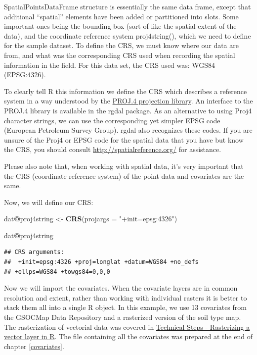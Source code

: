 \documentclass[10pt,b5paper,]{book}
\newenvironment{Shaded}{\begin{snugshade}}{\end{snugshade}}
\newcommand{\DataTypeTok}[1]{\textcolor[rgb]{0.13,0.29,0.53}{#1}}
\newcommand{\KeywordTok}[1]{\textcolor[rgb]{0.13,0.29,0.53}{\textbf{#1}}}
\newcommand{\NormalTok}[1]{#1}
\newcommand{\OperatorTok}[1]{\textcolor[rgb]{0.81,0.36,0.00}{\textbf{#1}}}
\newcommand{\StringTok}[1]{\textcolor[rgb]{0.31,0.60,0.02}{#1}}
\theoremstyle{definition}
\theoremstyle{definition}
\theoremstyle{definition}
\theoremstyle{remark}
\begin{document}
SpatialPointsDataFrame structure is essentially the same data frame,
except that additional ``spatial'' elements have been added or
partitioned into slots. Some important ones being the bounding box (sort
of like the spatial extent of the data), and the coordinate reference
system proj4string(), which we need to define for the sample dataset. To
define the CRS, we must know where our data are from, and what was the
corresponding CRS used when recording the spatial information in the
field. For this data set, the CRS used was: WGS84 (EPSG:4326).

To clearly tell R this information we define the CRS which describes a
reference system in a way understood by the
\href{http://trac.osgeo.org/proj/}{PROJ.4 projection library}. An
interface to the PROJ.4 library is available in the rgdal package. As an
alternative to using Proj4 character strings, we can use the
corresponding yet simpler EPSG code (European Petroleum Survey Group).
rgdal also recognizes these codes. If you are unsure of the Proj4 or
EPSG code for the spatial data that you have but know the CRS, you
should consult \url{http://spatialreference.org/} for assistance.

Please also note that, when working with spatial data, it's very
important that the CRS (coordinate reference system) of the point data
and covariates are the same.

Now, we will define our CRS:

\begin{Shaded}
\begin{Highlighting}[]
\NormalTok{dat}\OperatorTok{@}\NormalTok{proj4string <-}\StringTok{ }\KeywordTok{CRS}\NormalTok{(}\DataTypeTok{projargs =} \StringTok{"+init=epsg:4326"}\NormalTok{)}

\NormalTok{dat}\OperatorTok{@}\NormalTok{proj4string}
\end{Highlighting}
\end{Shaded}

\begin{verbatim}
## CRS arguments:
##  +init=epsg:4326 +proj=longlat +datum=WGS84 +no_defs
## +ellps=WGS84 +towgs84=0,0,0
\end{verbatim}

Now we will import the covariates. When the covariate layers are in
common resolution and extent, rather than working with individual
rasters it is better to stack them all into a single R object. In this
example, we use 13 covariates from the GSOCMap Data Repository and a
rasterized version of the soil type map. The rasterization of vectorial
data was covered in
\protect\hyperlink{technical-steps---rasterizing-a-vector-layer-in-r}{Technical
Steps - Rasterizing a vector layer in R}. The file containing all the
covariates was prepared at the end of chapter \ref{covariates}.
\end{document}
